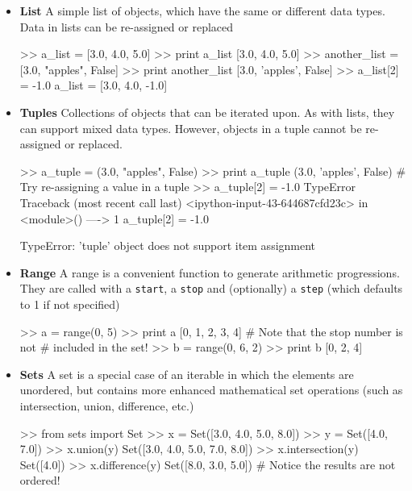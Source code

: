 \begin{itemize}
\item \textbf{List} A simple list of objects, which have the same or different data types. Data in lists can be re-assigned or replaced
\begin{python}[frame=single]
>> a_list = [3.0, 4.0, 5.0]
>> print a_list
[3.0, 4.0, 5.0]
>> another_list = [3.0, "apples", False]
>> print another_list
[3.0, 'apples', False]
>> a_list[2] = -1.0
a_list = [3.0, 4.0, -1.0]
\end{python}

\item \textbf{Tuples} Collections of objects that can be iterated upon. As with lists, they can support mixed data types. However, objects in a tuple cannot be re-assigned or replaced.
\begin{python}[frame=single]
>> a_tuple = (3.0, "apples", False)
>> print a_tuple
(3.0, 'apples', False)
# Try re-assigning a value in a tuple
>> a_tuple[2] = -1.0
TypeError                Traceback (most recent call last)
<ipython-input-43-644687cfd23c> in <module>()
----> 1 a_tuple[2] = -1.0

TypeError: 'tuple' object does not support item assignment
\end{python}

\item \textbf{Range} A range is a convenient function to generate arithmetic progressions. They are called with a \verb=start=, a \verb=stop= and (optionally) a \verb=step= (which defaults to 1 if not specified)

\begin{python}[frame=single]
>> a = range(0, 5)
>> print a
[0, 1, 2, 3, 4]  # Note that the stop number is not 
                 # included in the set!  
>> b = range(0, 6, 2)
>> print b
[0, 2, 4]
\end{python}

\item \textbf{Sets} A set is a special case of an iterable in which the elements are unordered, but contains more enhanced mathematical set operations (such as intersection, union, difference, etc.)

\begin{python}[frame=single]
>> from sets import Set
>> x = Set([3.0, 4.0, 5.0, 8.0])
>> y = Set([4.0, 7.0])
>> x.union(y)
Set([3.0, 4.0, 5.0, 7.0, 8.0])
>> x.intersection(y)
Set([4.0])
>> x.difference(y)
Set([8.0, 3.0, 5.0]) # Notice the results are not ordered!
\end{python}
\end{itemize}

